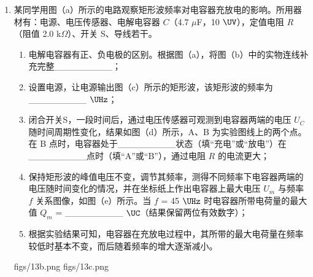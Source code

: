 \documentclass[\gkver]{gaokaozhenti}
\begin{document}
\begin{enumerate}
{（6）根据图像可知，动摩擦因数并不随角度的变化而发生变化，所以可以得到的结论为斜面倾角对动摩擦因数没有影响。
}

\item
某同学用图（a）所示的电路观察矩形波频率对电容器充放电的影响。所用器材有：电源、电压传感器、电解电容器 $C$（4.7 $\mu$F，10 $\UV$），定值电阻 $R$（阻值 2.0 k$\Omega$）、开关 S、导线若干。
\begin{enumerate}
	\item
	电解电容器有正、负电极的区别。根据图（a），将图（b）中的实物连线补充完整\_\_\_\_\_\_\_\_\_；
	\item
	设置电源，让电源输出图（c）所示的矩形波，该矩形波的频率为\_\_\_\_\_\_\_\_\_ $\UHz$；
	\item
	闭合开关S，一段时间后，通过电压传感器可观测到电容器两端的电压 $U_{C}$ 随时间周期性变化，结果如图（d）所示，A、B 为实验图线上的两个点。在 B 点时，电容器处于\_\_\_\_\_\_\_\_\_状态（填“充电”或“放电”）在\_\_\_\_\_\_\_\_\_点时（填“A”或“B”），通过电阻 $R$ 的电流更大；
	\item
	保持矩形波的峰值电压不变，调节其频率，测得不同频率下电容器两端的电压随时间变化的情况，并在坐标纸上作出电容器上最大电压 $U_{m}$ 与频率 $f$ 关系图像，如图（e）所示。当 $f$ = 45 $\UHz$ 时电容器所带电荷量的最大值 $Q_{m}$ = \_\_\_\_\_\_\_\_\_ $\UC$（结果保留两位有效数字）；
	\item
	根据实验结果可知，电容器在充放电过程中，其所带的最大电荷量在频率较低时基本不变，而后随着频率的增大逐渐减小。
\end{enumerate}
{figs/13b.png}
{figs/13c.png}
\end{enumerate}
\end{document}
